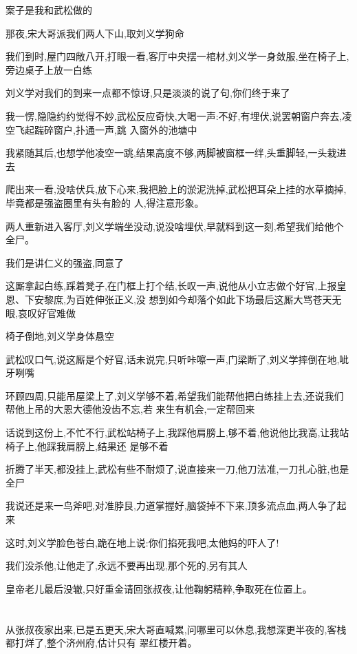﻿\documentclass[12pt]{article}
\begin{document}
案子是我和武松做的

那夜,宋大哥派我们两人下山,取刘义学狗命

我们到时,屋门四敞八开,打眼一看,客厅中央摆一棺材,刘义学一身敛服,坐在椅子上,旁边桌子上放一白练

刘义学对我们的到来一点都不惊讶,只是淡淡的说了句,你们终于来了

我一愣,隐隐约约觉得不妙,武松反应奇快,大喝一声:不好,有埋伏,说罢朝窗户奔去,凌空飞起踹碎窗户,扑通一声,跳
入窗外的池塘中

我紧随其后,也想学他凌空一跳,结果高度不够,两脚被窗框一绊,头重脚轻,一头栽进去

爬出来一看,没啥伏兵,放下心来,我把脸上的淤泥洗掉,武松把耳朵上挂的水草摘掉,毕竟都是强盗圈里有头有脸的
人,得注意形象。

两人重新进入客厅,刘义学端坐没动,说没啥埋伏,早就料到这一刻,希望我们给他个全尸。

我们是讲仁义的强盗,同意了

这厮拿起白练,踩着凳子,在门框上打个结,长叹一声,说他从小立志做个好官,上报皇恩、下安黎庶,为百姓伸张正义,没
想到如今却落个如此下场\dldots 最后这厮大骂苍天无眼,哀叹好官难做\dldots

椅子倒地,刘义学身体悬空

武松叹口气,说这厮是个好官,话未说完,只听咔嚓一声,门梁断了,刘义学摔倒在地,呲牙咧嘴

环顾四周,只能吊屋梁上了,刘义学够不着,希望我们能帮他把白练挂上去,还说我们帮他上吊的大恩大德他没齿不忘,若
来生有机会,一定帮回来

话说到这份上,不忙不行,武松站椅子上,我踩他肩膀上,够不着,他说他比我高,让我站椅子上,他踩我肩膀上,结果还
是够不着

折腾了半天,都没挂上,武松有些不耐烦了,说直接来一刀,他刀法准,一刀扎心脏,也是全尸

我说还是来一鸟斧吧,对准脖艮,力道掌握好,脑袋掉不下来,顶多流点血,两人争了起来

这时,刘义学脸色苍白,跪在地上说:你们掐死我吧,太他妈的吓人了!

我们没杀他,让他走了,永远不要再出现,那个死的,另有其人

皇帝老儿最后没辙,只好重金请回张叔夜,让他鞠躬精粹,争取死在位置上。


\section{}

从张叔夜家出来,已是五更天,宋大哥直喊累,问哪里可以休息,我想深更半夜的,客栈都打烊了,整个济州府,估计只有
翠红楼开着。
\end{document}
